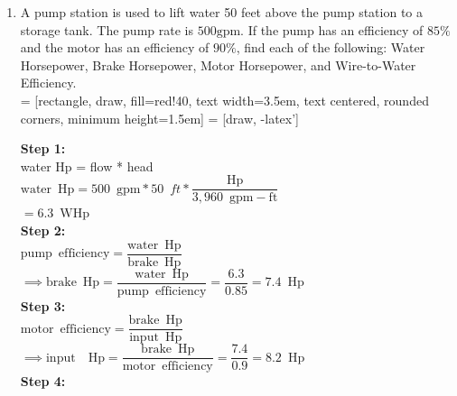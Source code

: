 \documentclass{article}
\begin{document}
\begin{enumerate}
\newpage

  \item A pump station is used to lift water 50 feet above the pump station to a storage tank. The pump rate is $500 \mathrm{gpm}$. If the pump has an efficiency of $85 \%$ and the motor has an efficiency of $90 \%$, find each of the following: Water Horsepower, Brake Horsepower, Motor Horsepower, and Wire-to-Water Efficiency.\\

 = [rectangle, draw, fill=red!40, 
    text width=3.5em, text centered, rounded corners, minimum height=1.5em]
 = [draw, -latex']
\begin{figure}[h!]
\centering
{}

\end{figure}
\textbf{Step 1:}\\
water Hp = flow * head\\
$\mathrm{water} \enspace \mathrm{Hp} = 500 \enspace \mathrm{gpm}*50 \enspace ft*\dfrac{\mathrm{Hp}}{3,960 \enspace \mathrm{gpm-ft}}$\\
$=\boxed{ 6.3 \enspace \mathrm{WHp}}$\\ 
\vspace{0.1cm}
  \textbf{Step 2:}\\
$\mathrm{pump \enspace efficiency} =\dfrac{\mathrm{water \enspace Hp}}{\mathrm{brake \enspace Hp}}$\\
$ \implies \mathrm{brake \enspace Hp}=\dfrac{\mathrm{water \enspace Hp}}{\mathrm{pump \enspace efficiency}} = \dfrac{6.3}{0.85}=\boxed{7.4 \enspace \mathrm{Hp}}$\\
\vspace{0.1cm}
  \textbf{Step 3:}\\
$\mathrm{motor \enspace efficiency} =\dfrac{\mathrm{brake \enspace Hp}}{\mathrm{input \enspace Hp}}$\\
$ \implies \mathrm{input \enspace \enspace Hp}=\dfrac{\mathrm{brake \enspace Hp}}{\mathrm{motor \enspace efficiency}}= \dfrac{7.4}{0.9}=\boxed{8.2 \enspace \mathrm{Hp}}$\\
\vspace{0.1cm}
  \textbf{Step 4:}\\


\end{enumerate}
\end{document}
